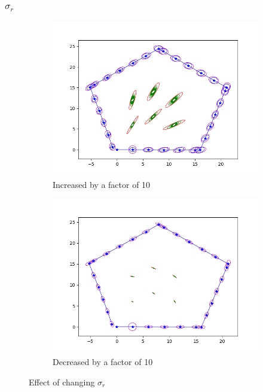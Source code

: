 \documentclass[12pt, a4paper]{article}
\begin{document}
\subsubsection{$\sigma_r$}
\begin{figure}[H]
  \centering
  \begin{subfigure}[b]{0.45\linewidth}
    \includegraphics[width=\linewidth]{./results/q3_2/result_r.png}
    \caption{Increased by a factor of 10}
  \end{subfigure}
  \hspace{0.5cm}
  \begin{subfigure}[b]{0.45\linewidth}
    \includegraphics[width=\linewidth]{./results/q3_2/result_r_dec.png}
    \caption{Decreased by a factor of 10}
  \end{subfigure}
  \caption{Effect of changing $\sigma_r$}
\end{figure}
\end{document}
